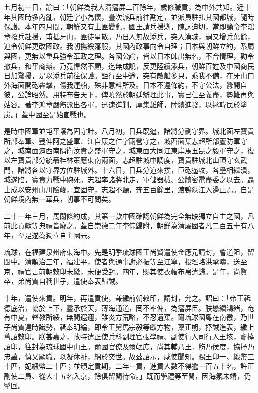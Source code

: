 \begin{pinyinscope}
七月初一日，諭曰：「朝鮮為我大清籓屏二百餘年，歲修職貢，為中外共知。近十年其國時多內亂，朝廷字小為懷，疊次派兵前往勘定，並派員駐扎其國都城，隨時保護。本年四月間，朝鮮又有土匪變亂，國王請兵援剿，陳詞迫切，當即諭令李鴻章撥兵赴援，甫抵牙山，匪徒星散。乃日人無故添兵，突入漢城，嗣又增兵萬餘，迫令朝鮮更改國政。我朝撫綏籓服，其國內政事向令自理；日本與朝鮮立約，系屬與國，更無以重兵強令革政之理。各國公論，皆以日本師出無名，不合情理，勸令撤兵，和平商辦。乃竟悍然不顧，迄無成說，反更陸續添兵，朝鮮百姓及中國商民日加驚擾，是以添兵前往保護。詎行至中途，突有敵船多只，乘我不備，在牙山口外海面開砲轟擊，傷我運船，殊非意料所及。日本不遵條約，不守公法，釁開自彼，公論昭然。用特布告天下，俾曉然於朝廷辦理此事，實已仁至義盡，勢難再與姑容。著李鴻章嚴飭派出各軍，迅速進剿，厚集雄師，陸續進發，以拯韓民於塗炭。」蓋中國至是始宣戰也。

是時中國軍並屯平壤為固守計。八月初，日兵既逼，諸將分劃守界。城北面左寶貴所部奉軍、豐伸阿之盛軍、江自康之仁字兩營守之，城西面葉志超所部蘆防軍守之，城南面迤西南隅衛汝貴之盛軍守之，城東面大同江東岸馬玉昆之毅軍守之，復以左寶貴部分統聶桂林策應東南兩面，志超駐城中調度，寶貴駐城北山頂守玄武門，諸將各以守界方位駐城外。十六日，日兵分道來撲，巨砲逼攻，各壘相繼潰，城遂陷，寶貴力戰中砲死。志超率諸將北走，軍儲器械、公牘密電盡委之以去。聶士成以安州山川險峻，宜固守，志超不聽，奔五百餘里，渡鴨綠江入邊止焉。自是朝鮮境內無一華兵，朝事不可問矣。

二十一年三月，馬關條約成，其第一款中國確認朝鮮為完全無缺獨立自主之國，凡前此貢獻等典禮皆廢之。蓋自崇德二年李倧歸附，朝鮮為清屬國者凡二百五十有八年，至是遂為獨立自主國云。

琉球，在福建泉州府東海中。先是明季琉球國王尚賢遣使金應元請封，會道阻，留閩中。清順治三年，福建平，使者與通事謝必振等至江寧，投經略洪承疇，送至京，禮官言前朝敕印未繳，未便受封。四年，賜其使衣帽布帛遣歸。是年，尚賢卒，弟尚質自稱世子，遣使奉表歸誠。

十年，遣使來貢。明年，再遣貢使，兼繳前朝敕印，請封，允之。詔曰：「帝王祗德底治，協於上下，靈承於天，薄海通道，罔不率俾，為籓屏臣。朕懋纘鴻緒，奄有中夏，聲教所綏，無間遐邇，雖炎方荒略，不忍遺棄。爾琉球國粵在南徼，乃世子尚質達時識勢，祗奉明綸，即令王舅馬宗毅等獻方物，稟正朔，抒誠進表，繳上舊詔敕印。朕甚嘉之，故特遣正使兵科副理官張學禮、副使行人司行人王垓，齎捧詔印，往封為琉球國中山王。爾國官僚及爾氓庶，尚其輔乃王，飭乃侯度，協抒乃忠藎，慎乂厥職，以凝休祉，綿於奕世。故茲詔示，咸使聞知。賜王印一、緞幣三十匹，妃緞幣二十匹；並頒定貢期，二年一貢，進貢人數不得逾一百五十名，許正副使二員、從人十五名入京，餘俱留閩待命。」既而學禮等至閩，因海氛未靖，仍掣回。


\end{pinyinscope}
